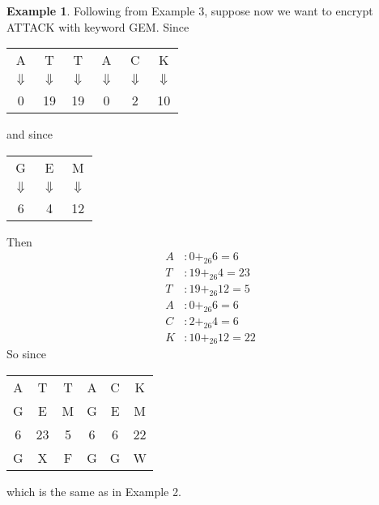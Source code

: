 \documentclass[11pt]{amsart}
\theoremstyle{definition}\newtheorem{definition}{Definition}
\theoremstyle{definition}\newtheorem{example}{Example}
\theoremstyle{definition}\newtheorem{samplecode}{Sample Code}
\begin{document}
\begin{example}
    Following from Example 3, suppose now we want to encrypt ATTACK with keyword GEM. Since
    \begin{center}
        \begin{tabular}{cccccc}
            A & T & T & A & C & K \\
            $\Downarrow$ & $\Downarrow$ & $\Downarrow$ & $\Downarrow$ & $\Downarrow$ & $\Downarrow$ \\
            0 & 19 & 19 & 0 & 2 & 10
        \end{tabular}
    \end{center}
    and since
    \begin{center}
        \begin{tabular}{ccc}
            G & E & M \\
            $\Downarrow$ & $\Downarrow$ & $\Downarrow$ \\
            6 & 4 & 12
        \end{tabular}
    \end{center}
    Then
    \begin{align*}
        A &: 0 +_{26} 6 = 6 \\
        T &: 19 +_{26} 4 = 23 \\
        T &: 19 +_{26} 12 = 5 \\
        A &: 0 +_{26} 6 = 6 \\
        C &: 2 +_{26} 4 = 6 \\
        K &: 10 +_{26} 12 = 22
    \end{align*}
    So since
    \begin{center}
        \begin{tabular}{cccccc}
            A & T & T & A & C & K \\
            G & E & M & G & E & M \\ \hline
            6 & 23 & 5 & 6 & 6 & 22 \\ \hline
            G & X & F & G & G & W
        \end{tabular}
    \end{center}
    which is the same as in Example 2.
\end{example}
\end{document}
